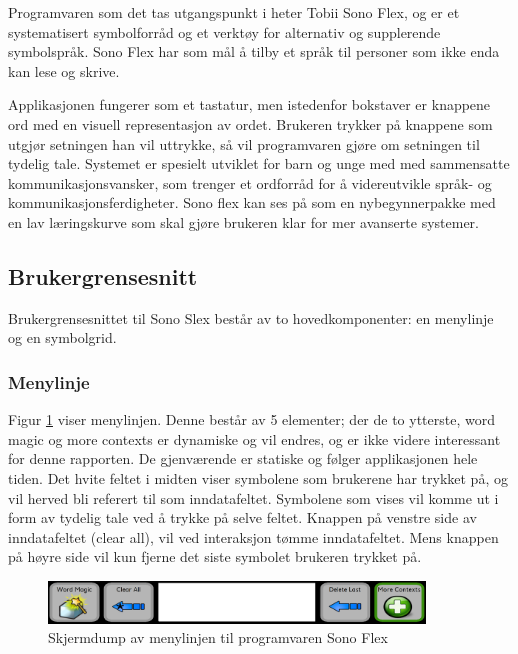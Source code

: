 \documentclass[phd,tocprelim]{cornell}
\begin{document}
Programvaren som det tas utgangspunkt i heter Tobii Sono Flex,  og er et systematisert symbolforråd og et verktøy for alternativ og supplerende symbolspråk. Sono Flex har som mål å tilby et språk til personer som ikke enda kan lese og skrive. 

Applikasjonen fungerer som et tastatur, men istedenfor bokstaver er knappene ord med en visuell representasjon av ordet. Brukeren trykker på knappene som utgjør setningen han vil uttrykke, så vil programvaren gjøre om setningen til tydelig tale.  Systemet er spesielt utviklet for barn og unge med med sammensatte kommunikasjonsvansker, som trenger et ordforråd for å videreutvikle språk- og kommunikasjonsferdigheter. Sono flex kan ses på som en nybegynnerpakke med en lav læringskurve som skal gjøre brukeren klar for mer avanserte systemer. 


\subsection{Brukergrensesnitt}

Brukergrensesnittet til Sono Slex består av to hovedkomponenter: en menylinje og en symbolgrid. 


\subsubsection{Menylinje}

Figur \ref{fig:menylinje} viser menylinjen.  Denne består av 5 elementer; der de to ytterste,  word magic og more contexts er dynamiske og vil endres, og er ikke videre interessant for denne rapporten.  De gjenværende er statiske og følger applikasjonen hele tiden. Det hvite feltet i midten viser symbolene som brukerene har trykket på, og vil herved bli referert til som inndatafeltet. Symbolene som vises vil komme ut i form av tydelig tale ved å trykke på selve feltet. Knappen på venstre side av inndatafeltet (clear all), vil ved interaksjon tømme inndatafeltet. Mens knappen på høyre side vil kun fjerne det siste symbolet brukeren trykket på.


\begin{figure}[ht!]
\centering
\includegraphics[width=100mm]{menylinje}
\caption{Skjermdump av menylinjen til programvaren Sono Flex}
\label{fig:menylinje}
\end{figure}
\end{document}
